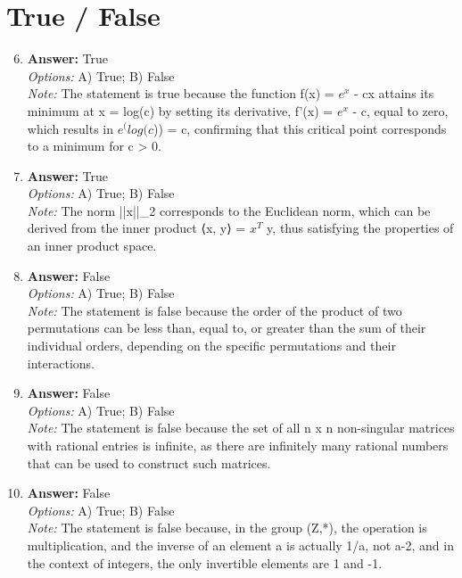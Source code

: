 \documentclass[12pt]{article}
\begin{document}
\section*{True / False}
\begin{enumerate}[label=\arabic*.]
\setcounter{enumi}{5}
\item \textbf{Answer:} True
\\ \textit{Options:} A) True; B) False
\\ \textit{Note:} The statement is true because the function f(x) = $e^x$ - cx attains its minimum at x = log(c) by setting its derivative, f'(x) = $e^x$ - c, equal to zero, which results in $e^(log(c$)) = c, confirming that this critical point corresponds to a minimum for c \textgreater{} 0.
\item \textbf{Answer:} True
\\ \textit{Options:} A) True; B) False
\\ \textit{Note:} The norm ||x||\_2 corresponds to the Euclidean norm, which can be derived from the inner product ⟨x, y⟩ = $x^T$ y, thus satisfying the properties of an inner product space.
\item \textbf{Answer:} False
\\ \textit{Options:} A) True; B) False
\\ \textit{Note:} The statement is false because the order of the product of two permutations can be less than, equal to, or greater than the sum of their individual orders, depending on the specific permutations and their interactions.
\item \textbf{Answer:} False
\\ \textit{Options:} A) True; B) False
\\ \textit{Note:} The statement is false because the set of all n x n non-singular matrices with rational entries is infinite, as there are infinitely many rational numbers that can be used to construct such matrices.
\item \textbf{Answer:} False
\\ \textit{Options:} A) True; B) False
\\ \textit{Note:} The statement is false because, in the group (Z,*), the operation is multiplication, and the inverse of an element a is actually 1/a, not a-2, and in the context of integers, the only invertible elements are 1 and -1.
\end{enumerate}
\end{document}
